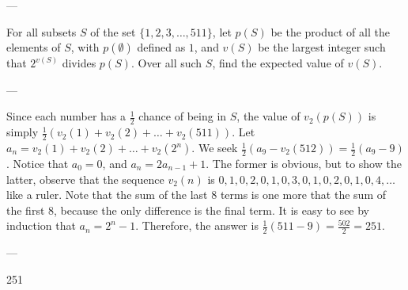 
---

For all subsets $S$ of the set $\{1, 2, 3, \ldots, 511\}$, let $p(S)$ be the product of all the elements of $S$, with $p\left(\emptyset\right)$ defined as $1$, and $v(S)$ be the largest integer such that $2^{v(S)}$ divides $p(S)$. Over all such $S$, find the expected value of $v(S)$. 

---

Since each number has a $\frac{1}{2}$ chance of being in $S$, the value of $v_2(p(S))$ is simply $\frac{1}{2}\left(v_2(1)+v_2(2)+\ldots+v_2(511)\right)$. Let $a_n=v_2(1)+v_2(2)+\ldots+v_2\left(2^n\right)$. We seek $\frac{1}{2}(a_9-v_2(512))=\frac{1}{2}(a_9-9)$. Notice that $a_0=0$, and $a_n=2a_{n-1}+1$. The former is obvious, but to show the latter, observe that the sequence $v_2(n)$ is $0,1,0,2,0,1,0,3,0,1,0,2,0,1,0,4,\ldots$ like a ruler. Note that the sum of the last $8$ terms is one more that the sum of the first $8$, because the only difference is the final term. It is easy to see by induction that $a_n=2^n-1$. Therefore, the answer is $\frac{1}{2}(511-9)=\frac{502}{2}=251$.

---

251
